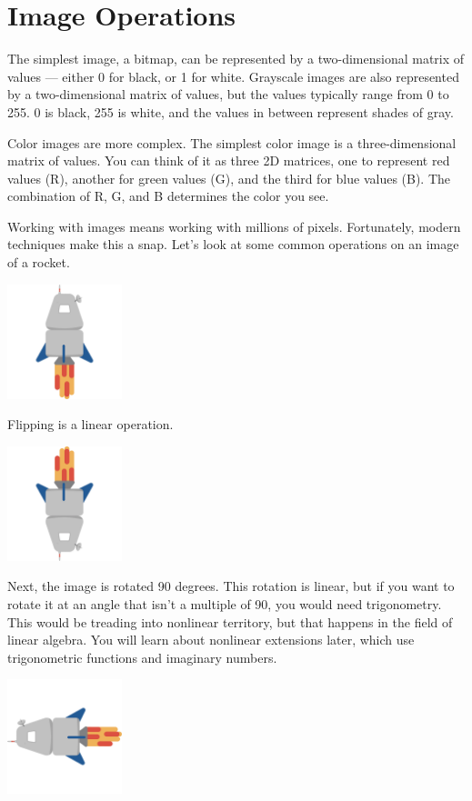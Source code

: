 \section{Image Operations}
The simplest image, a bitmap, can be represented by a two-dimensional matrix of values --- either 0 for black, or 1 for white. Grayscale images are also represented by a two-dimensional matrix of values, but the values typically range from 0 to 255. 0 is black, 255 is white, and the values in between represent shades of gray. 

Color images are more complex. The simplest color image is a three-dimensional matrix of values. You can think of it as three 2D matrices, one to represent red values (R), another for green values (G), and the third for blue values (B). The combination of R, G, and B determines the color you see.

Working with images means working with millions of pixels. Fortunately, modern techniques make this a snap. Let's look at some common operations on an image of a rocket.

\includegraphics[width=0.25\textwidth]{flying-rocket.png}

Flipping is a linear operation.

\includegraphics[width=0.25\textwidth]{rocket-flipped.png}

Next, the image is rotated 90 degrees. This rotation is linear, but if you want to rotate it at an angle that isn't a multiple of 90, you would need trigonometry. This would be treading into nonlinear territory, but that happens in the field of linear algebra. You will learn about nonlinear extensions later, which use trigonometric functions and imaginary numbers.

\includegraphics[width=0.25\textwidth]{rocket-rotated-90.png}

